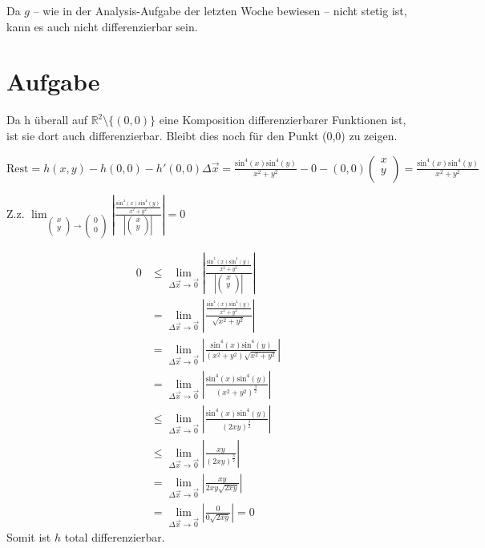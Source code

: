 \documentclass[10pt,a4paper,parskip=half]{scrartcl}
\newcommand{\vectwo}[2]{\left(\begin {array} {c} #1 \\ #2 \\ \end {array} \right)}
\begin{document}
\begin{enumerate}[(i)]
Da $g$ -- wie in der Analysis-Aufgabe der letzten Woche bewiesen -- nicht stetig ist, kann es auch nicht differenzierbar sein.
\section{Aufgabe}
Da h überall auf $\mathbb R^2\setminus{\{(0,0)\}}$ eine Komposition differenzierbarer Funktionen ist, ist sie dort auch differenzierbar. Bleibt dies noch für den Punkt (0,0) zu zeigen.

$\text{Rest} = h(x,y) - h(0,0) - h'(0,0) \Delta \vec x = \frac{\text{sin}^4(x)\text{sin}^4(y)}{x^2 + y^2} - 0 - (0,0) \vectwo{x}{y} = \frac{\text{sin}^4(x)\text{sin}^4(y)}{x^2 + y^2}$

Z.z. $\lim_{\vectwo{x}{y} \to \vectwo{0}{0}} \left|\frac{\frac{\text{sin}^4(x)\text{sin}^4(y)}{x^2 + y^2}}{\left|\vectwo{x}{y}\right|}\right| = 0$

\begin{align*}
0 &\le\lim_{\Delta \vec x \to \vec 0} \left|\frac{\frac{\text{sin}^4(x)\text{sin}^4(y)}{x^2 + y^2}}{\left|\vectwo{x}{y}\right|}\right| \\
&= \lim_{\Delta \vec x \to \vec 0} \left|\frac{\frac{\text{sin}^4(x)\text{sin}^4(y)}{x^2 + y^2}}{\sqrt{x^2+y^2}}\right| \\
&= \lim_{\Delta \vec x \to \vec 0} \left|\frac{\text{sin}^4(x)\text{sin}^4(y)}{(x^2 + y^2)\sqrt{x^2+y^2}}\right| \\
&= \lim_{\Delta \vec x \to \vec 0} \left|\frac{\text{sin}^4(x)\text{sin}^4(y)}{(x^2 + y^2)^{\frac{3}{2}}}\right| \\
&\le \lim_{\Delta \vec x \to \vec 0} \left|\frac{\text{sin}^4(x)\text{sin}^4(y)}{(2xy)^{\frac{3}{2}}}\right| \\
&\le \lim_{\Delta \vec x \to \vec 0} \left|\frac{xy}{(2xy)^{\frac{3}{2}}}\right| \\
&= \lim_{\Delta \vec x \to \vec 0} \left|\frac{xy}{2xy\sqrt{2xy}}\right| \\
&= \lim_{\Delta \vec x \to \vec 0} \left|\frac{0}{0\sqrt{2xy}}\right| =0
\end{align*}
Somit ist $h$ total differenzierbar.

\end{enumerate}
\end{document}
